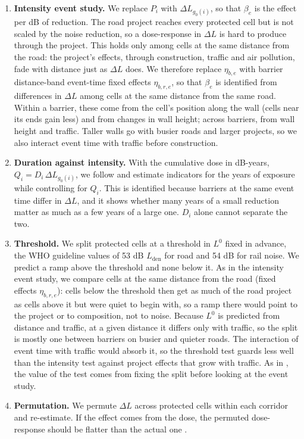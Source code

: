\documentclass[11pt]{article}
\begin{document}
\begin{enumerate}
\item \textbf{Intensity event study.} We replace \(P_i\) with \(\Delta L_{g_0(i)}\), so that \(\beta_e\) is the effect per dB of reduction. The road project reaches every protected cell but is not scaled by the noise reduction, so a dose-response in \(\Delta L\) is hard to produce through the project. This holds only among cells at the same distance from the road: the project's effects, through construction, traffic and air pollution, fade with distance just as \(\Delta L\) does. We therefore replace \(\eta_{b,e}\) with barrier \texttimes{} distance-band \texttimes{} event-time fixed effects \(\eta_{b,r,e}\), so that \(\beta_e\) is identified from differences in \(\Delta L\) among cells at the same distance from the same road. Within a barrier, these come from the cell's position along the wall (cells near its ends gain less) and from changes in wall height; across barriers, from wall height and traffic. Taller walls go with busier roads and larger projects, so we also interact event time with traffic before construction.
\item \textbf{Duration against intensity.} With the cumulative dose in dB-years, \(Q_i = D_i\, \Delta L_{g_0(i)}\), we follow \textcite{hollingsworthThousandCutsCumulative2025} and estimate indicators for the years of exposure while controlling for \(Q_i\). This is identified because barriers at the same event time differ in \(\Delta L\), and it shows whether many years of a small reduction matter as much as a few years of a large one. \(D_i\) alone cannot separate the two.
\item \textbf{Threshold.} We split protected cells at a threshold in \(L^0\) fixed in advance, the WHO guideline values of 53 dB \(L_{\text{den}}\) for road and 54 dB for rail noise. We predict a ramp above the threshold and none below it. As in the intensity event study, we compare cells at the same distance from the road (fixed effects \(\eta_{b,r,e}\)): cells below the threshold then get as much of the road project as cells above it but were quiet to begin with, so a ramp there would point to the project or to composition, not to noise. Because \(L^0\) is predicted from distance and traffic, at a given distance it differs only with traffic, so the split is mostly one between barriers on busier and quieter roads. The interaction of event time with traffic would absorb it, so the threshold test guards less well than the intensity test against project effects that grow with traffic. As in \textcite{gronqvistUnderstandingHowLow2020}, the value of the test comes from fixing the split before looking at the event study.
\item \textbf{Permutation.} We permute \(\Delta L\) across protected cells within each corridor and re-estimate. If the effect comes from the dose, the permuted dose-response should be flatter than the actual one \autocite{hollingsworthThousandCutsCumulative2025}.
\end{enumerate}
\end{document}
